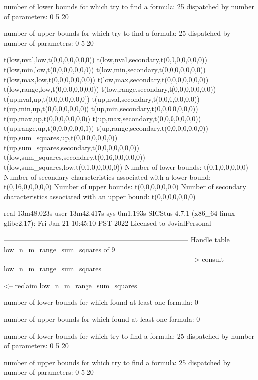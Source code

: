 number of lower bounds for which try to find a formula: 25
dispatched by number of parameters: 0  5  20

number of upper bounds for which try to find a formula: 25
dispatched by number of parameters: 0  5  20

t(low,nval,low,t(0,0,0,0,0,0,0))
t(low,nval,secondary,t(0,0,0,0,0,0,0))
t(low,min,low,t(0,0,0,0,0,0,0))
t(low,min,secondary,t(0,0,0,0,0,0,0))
t(low,max,low,t(0,0,0,0,0,0,0))
t(low,max,secondary,t(0,0,0,0,0,0,0))
t(low,range,low,t(0,0,0,0,0,0,0))
t(low,range,secondary,t(0,0,0,0,0,0,0))
t(up,nval,up,t(0,0,0,0,0,0,0))
t(up,nval,secondary,t(0,0,0,0,0,0,0))
t(up,min,up,t(0,0,0,0,0,0,0))
t(up,min,secondary,t(0,0,0,0,0,0,0))
t(up,max,up,t(0,0,0,0,0,0,0))
t(up,max,secondary,t(0,0,0,0,0,0,0))
t(up,range,up,t(0,0,0,0,0,0,0))
t(up,range,secondary,t(0,0,0,0,0,0,0))
t(up,sum_squares,up,t(0,0,0,0,0,0,0))
t(up,sum_squares,secondary,t(0,0,0,0,0,0,0))
t(low,sum_squares,secondary,t(0,16,0,0,0,0,0))
t(low,sum_squares,low,t(0,1,0,0,0,0,0))
Number of lower bounds:                                             t(0,1,0,0,0,0,0)
Number of secondary characteristics associated with a lower bound:  t(0,16,0,0,0,0,0)
Number of upper bounds:                                             t(0,0,0,0,0,0,0)
Number of secondary characteristics associated with an upper bound: t(0,0,0,0,0,0,0)

real	13m48.023s
user	13m42.417s
sys	0m1.193s
SICStus 4.7.1 (x86_64-linux-glibc2.17): Fri Jan 21 10:45:10 PST 2022
Licensed to JovialPersonal


--------------------------------------------------------------------------------
Handle table low_n_m_range_sum_squares of 9
--------------------------------------------------------------------------------
--> consult low_n_m_range_sum_squares

<-- reclaim low_n_m_range_sum_squares

number of lower bounds for which found at least one formula: 0

number of upper bounds for which found at least one formula: 0

number of lower bounds for which try to find a formula: 25
dispatched by number of parameters: 0  5  20

number of upper bounds for which try to find a formula: 25
dispatched by number of parameters: 0  5  20


